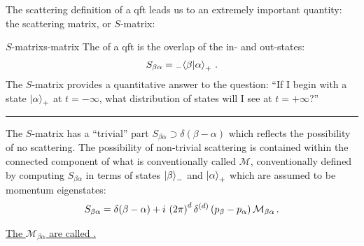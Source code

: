 

The scattering definition of a \gls{qft} leads us to an extremely important quantity:
%
the scattering matrix, or \(S\)-matrix:

\begin{definitionbox}{\(S\)-matrix}{s-matrix}
    The  of a \gls{qft} is the overlap of the in- and out-states:
    \begin{align}
        S_{\beta \alpha}
        =
        {}_-\!\braket{\beta}{\alpha}_+
        \,.
    \end{align}
    The \(S\)-matrix provides a quantitative answer to the question:
    ``If I begin with a state \(\ket{\alpha}_+\) at \(t = -\infty\), what distribution of states will I see at \(t = +\infty\)?''

    \vspace{7pt}
    \hrule
    \vspace{7pt}

    The \(S\)-matrix has a ``trivial'' part \(S_{\beta\alpha} \supset \delta(\beta - \alpha)\) which reflects the possibility of no scattering.
    The possibility of non-trivial scattering is contained within the connected component of what is conventionally called \(\mathcal{M}\), conventionally defined by computing \(S_{\beta\alpha}\) in terms of states \(\ket{\beta}_-\) and \(\ket{\alpha}_+\) which are assumed to be momentum eigenstates:
    \begin{align}
        S_{\beta \alpha}
        =
        \delta(\beta - \alpha)
        +
        i\,
        \left(2\pi\right)^d \delta^{(d)}\left(p_\beta - p_\alpha\right)
        \mathcal{M}_{\beta\alpha}
        \,.
    \end{align}

    \underline{The \(\mathcal{M}_{\beta\alpha}\) are called .}
\end{definitionbox}

